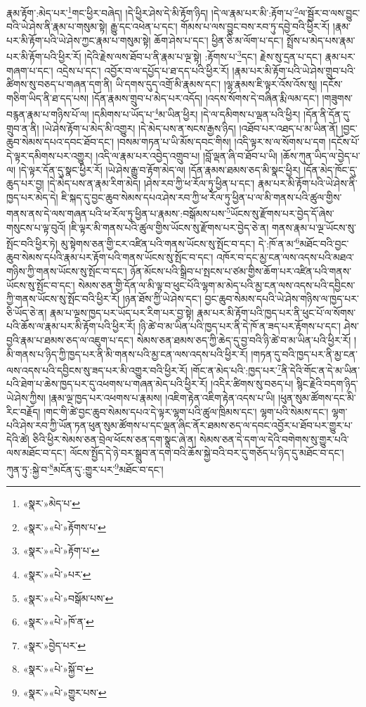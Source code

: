 རྣམ་རྟོག་:མེད་པར་\footnote{«སྣར་»མེད་པ་}གང་ཕྱིར་བཞེད། །དེ་ཕྱིར་ཤེས་དེ་མི་རྟོག་ཉིད། །དེ་ལ་རྣམ་པར་མི་:རྟོག་པ་\footnote{«སྣར་»«པེ་»རྟོགས་པ་}ལ་སྦྱོར་བ་ལས་བྱུང་བའི་ཡེ་ཤེས་ནི་རྣམ་པ་གསུམ་སྟེ། རྒྱུ་དང་འཕེན་པ་དང་། གོམས་པ་ལས་བྱུང་བས་རབ་ཏུ་དབྱེ་བའི་ཕྱིར་རོ། །རྣམ་པར་མི་རྟོག་པའི་ཡེ་ཤེས་ཀྱང་རྣམ་པ་གསུམ་སྟེ། ཆོག་ཤེས་པ་དང་། ཕྱིན་ཅི་མ་ལོག་པ་དང་། སྤྲོས་པ་མེད་པས་རྣམ་པར་མི་རྟོག་པའི་ཕྱིར་རོ། །དེའི་རྗེས་ལས་ཐོབ་པ་ནི་རྣམ་པ་ལྔ་སྟེ། :རྟོགས་པ་\footnote{«སྣར་»«པེ་»རྟོག་པ་}དང་། རྗེས་སུ་དྲན་པ་དང་། རྣམ་པར་གཞག་པ་དང་། འདྲེས་པ་དང་། འབྱོར་བ་ལ་དཔྱོད་པ་ཐ་དད་པའི་ཕྱིར་རོ། །རྣམ་པར་མི་རྟོག་པའི་ཡེ་ཤེས་གྲུབ་པའི་ཚིགས་སུ་བཅད་པ་གཞན་དག་ནི། ཡི་དགས་དུད་འགྲོ་མི་རྣམས་དང་། །ལྷ་རྣམས་ཇི་ལྟར་འོས་འོས་སུ། །དངོས་གཅིག་ཡིད་ནི་ཐ་དད་པས། །དོན་རྣམས་གྲུབ་པ་མེད་པར་འདོད། །འདས་སོགས་དེ་བཞིན་རྨི་ལམ་དང་། །གཟུགས་བརྙན་རྣམ་པ་གཉིས་པོ་ལ། །དམིགས་པ་ཡོད་པ་\footnote{«སྣར་»«པེ་»པར་}མ་ཡིན་ཕྱིར། །དེ་ལ་དམིགས་པ་ལྡན་པའི་ཕྱིར། །དོན་ནི་དོན་དུ་གྲུབ་ན་ནི། །ཡེ་ཤེས་རྟོག་པ་མེད་མི་འགྱུར། །དེ་མེད་པས་ན་སངས་རྒྱས་ཉིད། །འཐོབ་པར་འཐད་པ་མ་ཡིན་ནོ། །བྱང་ཆུབ་སེམས་དཔའ་དབང་ཐོབ་དང་། །བསམ་གཏན་པ་ཡི་མོས་དབང་གིས། །འདི་ལྟར་ས་ལ་སོགས་པ་དག །དངོས་པོ་དེ་ལྟར་དམིགས་པར་འགྱུར། །འདི་ལ་རྣམ་པར་འབྱེད་འགྲུབ་པ། །བློ་ལྡན་ཞི་བ་ཐོབ་པ་ཡི། །ཆོས་ཀུན་ཡིད་ལ་བྱེད་པ་ལ། །དེ་ལྟར་དོན་དུ་སྣང་ཕྱིར་རོ། །ཡེ་ཤེས་རྒྱུ་བ་རྟོག་མེད་ལ། །དོན་རྣམས་ཐམས་ཅད་མི་སྣང་ཕྱིར། །དོན་མེད་ཁོང་དུ་ཆུད་པར་བྱ། །དེ་མེད་པས་ན་རྣམ་རིག་མེད། །ཤེས་རབ་ཀྱི་ཕ་རོལ་ཏུ་ཕྱིན་པ་དང་། རྣམ་པར་མི་རྟོག་པའི་ཡེ་ཤེས་ནི་ཁྱད་པར་མེད་དེ། ཇི་སྐད་དུ་བྱང་ཆུབ་སེམས་དཔའ་ཤེས་རབ་ཀྱི་ཕ་རོལ་ཏུ་ཕྱིན་པ་ལ་མི་གནས་པའི་ཚུལ་གྱིས་གནས་ནས་དེ་ལས་གཞན་པའི་ཕ་རོལ་ཏུ་ཕྱིན་པ་རྣམས་:བསྒོམས་པས་\footnote{«སྣར་»«པེ་»བསྒོམ་པས་}ཡོངས་སུ་རྫོགས་པར་བྱེད་དོ་ཞེས་གསུངས་པ་ལྟ་བུའོ། །ཇི་ལྟར་མི་གནས་པའི་ཚུལ་གྱིས་ཡོངས་སུ་རྫོགས་པར་བྱེད་ཅེ་ན། གནས་རྣམ་པ་ལྔ་ཡོངས་སུ་སྤོང་བའི་ཕྱིར་ཏེ། མུ་སྟེགས་ཅན་གྱི་ངར་འཛིན་པའི་གནས་ཡོངས་སུ་སྤོང་བ་དང་། དེ་:ཁོ་ན་མ་\footnote{«སྣར་»«པེ་»ཁོ་ན་}མཐོང་བའི་བྱང་ཆུབ་སེམས་དཔའི་རྣམ་པར་རྟོག་པའི་གནས་ཡོངས་སུ་སྤོང་བ་དང་། འཁོར་བ་དང་མྱ་ངན་ལས་འདས་པའི་མཐའ་གཉིས་ཀྱི་གནས་ཡོངས་སུ་སྤོང་བ་དང་། ཉོན་མོངས་པའི་སྒྲིབ་པ་སྤངས་པ་ཙམ་གྱིས་ཆོག་པར་འཛིན་པའི་གནས་ཡོངས་སུ་སྤོང་བ་དང་། སེམས་ཅན་གྱི་དོན་ལ་མི་ལྟ་བ་ཕུང་པོའི་ལྷག་མ་མེད་པའི་མྱ་ངན་ལས་འདས་པའི་དབྱིངས་ཀྱི་གནས་ཡོངས་སུ་སྤོང་བའི་ཕྱིར་རོ། །ཉན་ཐོས་ཀྱི་ཡེ་ཤེས་དང་། བྱང་ཆུབ་སེམས་དཔའི་ཡེ་ཤེས་གཉིས་ལ་ཁྱད་པར་ཅི་ཡོད་ཅེ་ན། རྣམ་པ་ལྔས་ཁྱད་པར་ཡོད་པར་རིག་པར་བྱ་སྟེ། རྣམ་པར་མི་རྟོག་པའི་ཁྱད་པར་ནི་ཕུང་པོ་ལ་སོགས་པའི་ཆོས་ལ་རྣམ་པར་མི་རྟོག་པའི་ཕྱིར་རོ། །ཉི་ཚེ་བ་མ་ཡིན་པའི་ཁྱད་པར་ནི་དེ་ཁོ་ན་ཟད་པར་རྟོགས་པ་དང་། ཤེས་བྱའི་རྣམ་པ་ཐམས་ཅད་ལ་འཇུག་པ་དང་། སེམས་ཅན་ཐམས་ཅད་ཀྱི་ཆེད་དུ་བྱ་བའི་ཉི་ཚེ་བ་མ་ཡིན་པའི་ཕྱིར་རོ། །མི་གནས་པ་ཉིད་ཀྱི་ཁྱད་པར་ནི་མི་གནས་པའི་མྱ་ངན་ལས་འདས་པའི་ཕྱིར་རོ། །གཏན་དུ་བའི་ཁྱད་པར་ནི་མྱ་ངན་ལས་འདས་པའི་དབྱིངས་སུ་ཟད་པར་མི་འགྱུར་བའི་ཕྱིར་རོ། །གོང་ན་མེད་པའི་:ཁྱད་པར་\footnote{«སྣར་»བྱེད་པར་}ནི་དེའི་གོང་ན་དེ་མ་ཡིན་པའི་ཐེག་པ་ཆེས་ཁྱད་པར་དུ་འཕགས་པ་གཞན་མེད་པའི་ཕྱིར་རོ། །འདིར་ཚིགས་སུ་བཅད་པ། སྙིང་རྗེའི་བདག་ཉིད་ཡེ་ཤེས་ཀྱིས། །རྣམ་ལྔ་ཁྱད་པར་འཕགས་པ་རྣམས། །འཇིག་རྟེན་འཇིག་རྟེན་འདས་པ་ཡི། །ཕུན་སུམ་ཚོགས་དང་མི་རིང་བརྗོད། །གང་གི་ཚེ་བྱང་ཆུབ་སེམས་དཔའ་དེ་ལྟར་ལྷག་པའི་ཚུལ་ཁྲིམས་དང་། ལྷག་པའི་སེམས་དང་། ལྷག་པའི་ཤེས་རབ་ཀྱི་ཡོན་ཏན་ཕུན་སུམ་ཚོགས་པ་དང་ལྡན་ཞིང་ནོར་ཐམས་ཅད་ལ་དབང་འབྱོར་པ་ཐོབ་པར་གྱུར་པ་དེའི་ཚེ། ཅིའི་ཕྱིར་སེམས་ཅན་བྲེལ་ཕོངས་ཅན་དག་སྣང་ཞེ་ན། སེམས་ཅན་དེ་དག་ལ་དེའི་བགེགས་སུ་གྱུར་པའི་ལས་མཐོང་བ་དང་། ལོངས་སྤྱོད་དེ་ཉེ་བར་སྒྲུབ་ན་དགེ་བའི་ཆོས་སྐྱེ་བའི་བར་དུ་གཅོད་པ་ཉིད་དུ་མཐོང་བ་དང་། ཀུན་ཏུ་:སྐྱེ་བ་\footnote{«སྣར་»«པེ་»སྐྱོ་བ་}མངོན་དུ་:གྱུར་པར་\footnote{«སྣར་»«པེ་»གྱུར་པས་}མཐོང་བ་དང་། 